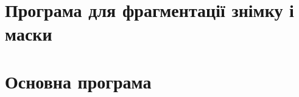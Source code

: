 \label{appendix:A}

\section{Програма для фрагментації знімку і маски}


\section{Основна програма}

